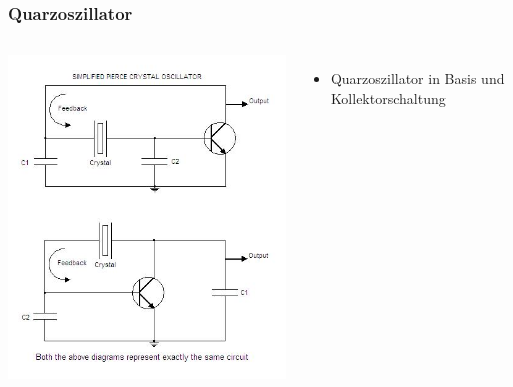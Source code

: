 \begin{frame}
  \frametitle{Quarzoszillator}
  \begin{columns}
    \includegraphics[width=\textwidth,height=.85\textheight,keepaspectratio]{a07/PIERCE_CRYSTAL_OSCILLATOR.jpg}
    \begin{itemize}
      \item Quarzoszillator in Basis und Kollektorschaltung
    \end{itemize}
  \end{columns}
\end{frame}

